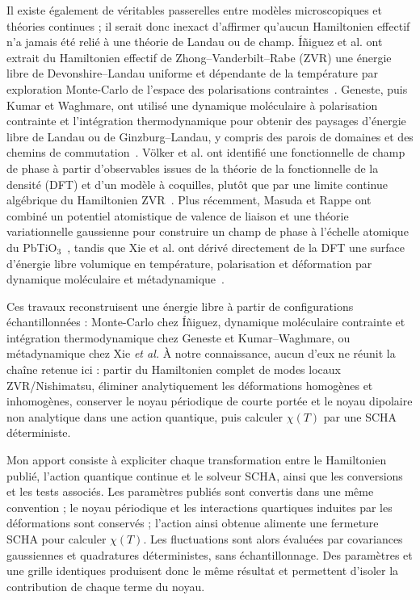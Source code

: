 \documentclass{rapportCS}
\begin{document}
Il existe également de véritables passerelles entre modèles microscopiques et
théories continues ; il serait donc inexact d'affirmer qu'aucun Hamiltonien
effectif n'a jamais été relié à une théorie de Landau ou de champ. Íñiguez et
al. ont extrait du Hamiltonien effectif de Zhong--Vanderbilt--Rabe (ZVR) une
énergie libre de Devonshire--Landau
uniforme et dépendante de la température par exploration Monte-Carlo de
l'espace des polarisations contraintes~\cite{Iniguez2001}. Geneste, puis Kumar
et Waghmare, ont utilisé une dynamique moléculaire à polarisation contrainte et
l'intégration thermodynamique pour obtenir des paysages d'énergie libre de
Landau ou de Ginzburg--Landau, y compris des parois de domaines et des chemins
de commutation~\cite{Geneste2009,KumarWaghmare2010}. Völker et al. ont identifié
une fonctionnelle de champ de phase à partir d'observables issues de la théorie
de la fonctionnelle de la densité (DFT) et d'un modèle à
coquilles, plutôt que par une limite continue algébrique du Hamiltonien
ZVR~\cite{Volker2011}. Plus récemment, Masuda et Rappe ont combiné un potentiel
atomistique de valence de liaison et une théorie variationnelle gaussienne pour
construire un champ de phase à l'échelle atomique du
PbTiO$_3$~\cite{MasudaRappe2025}, tandis que Xie et al. ont dérivé directement
de la DFT une surface d'énergie libre volumique en température, polarisation et
déformation par dynamique moléculaire et métadynamique~\cite{Xie2026}.

Ces travaux reconstruisent une énergie libre à partir de configurations
échantillonnées : Monte-Carlo chez Íñiguez, dynamique moléculaire contrainte et
intégration thermodynamique chez Geneste et Kumar--Waghmare, ou métadynamique
chez Xie \emph{et al.} À notre connaissance, aucun d'eux ne réunit la chaîne
retenue ici : partir du Hamiltonien complet de modes locaux ZVR/Nishimatsu,
éliminer analytiquement les déformations homogènes et inhomogènes, conserver le
noyau périodique de courte portée et le noyau dipolaire non analytique dans une
action quantique, puis calculer $\chi(T)$ par une SCHA déterministe.

Mon apport consiste à expliciter chaque transformation entre le Hamiltonien
publié, l'action quantique continue et le solveur SCHA, ainsi que les conversions
et les tests associés. Les
paramètres publiés sont convertis dans une même convention ; le noyau périodique
et les interactions quartiques induites par les déformations sont conservés ;
l'action ainsi obtenue alimente une fermeture SCHA pour calculer $\chi(T)$. Les
fluctuations sont alors évaluées par covariances gaussiennes et quadratures
déterministes, sans échantillonnage. Des paramètres et une grille identiques
produisent donc le même résultat et permettent d'isoler la contribution de
chaque terme du noyau.
\end{document}
